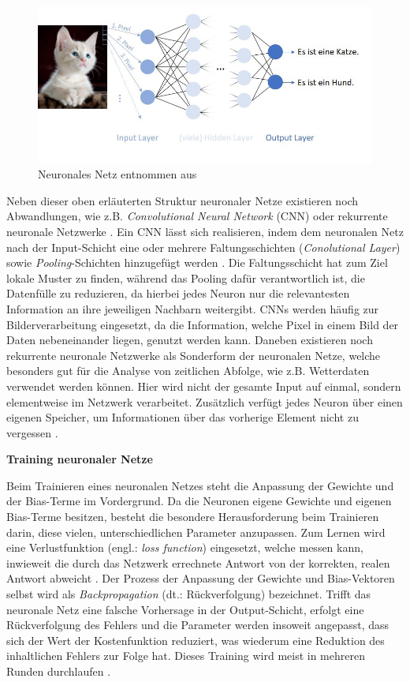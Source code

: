 \begin{figure}
    \centering
    \includegraphics[scale=0.8]{pic/MA-Bilder/neuronalesNetz.jpg}
    \caption{Neuronales Netz entnommen aus \cite{MuellerKI}}
    \label{Fig:neuronalesNetz}
\end{figure}%

Neben dieser oben erläuterten Struktur neuronaler Netze existieren noch Abwandlungen, wie z.B. \emph{Convolutional Neural Network} (CNN) oder rekurrente neuronale Netzwerke \cite{Choo.2020}. Ein CNN lässt sich realisieren, indem dem neuronalen Netz nach der Input-Schicht eine oder mehrere Faltungsschichten (\emph{Conolutional Layer}) sowie \emph{Pooling}-Schichten hinzugefügt werden \cite{Ng.2018, Choo.2020}. Die Faltungsschicht hat zum Ziel lokale Muster zu finden, während das Pooling dafür verantwortlich ist, die Datenfülle zu reduzieren, da hierbei jedes Neuron nur die relevantesten Information an ihre jeweiligen Nachbarn weitergibt. CNNs werden häufig zur Bilderverarbeitung eingesetzt, da die Information, welche Pixel in einem Bild der Daten nebeneinander liegen, genutzt werden kann. Daneben existieren noch rekurrente neuronale Netzwerke als Sonderform der neuronalen Netze, welche besonders gut für die Analyse von zeitlichen Abfolge, wie z.B. Wetterdaten verwendet werden können. Hier wird nicht der gesamte Input auf einmal, sondern elementweise im Netzwerk verarbeitet. Zusätzlich verfügt jedes Neuron über einen eigenen Speicher, um Informationen über das vorherige Element nicht zu vergessen \cite{Choo.2020}.

\textbf{Training neuronaler Netze}

Beim Trainieren eines neuronalen Netzes steht die Anpassung der Gewichte und der Bias-Terme im Vordergrund. Da die Neuronen eigene Gewichte und eigenen Bias-Terme besitzen, besteht die besondere Herausforderung beim Trainieren darin, diese vielen, unterschiedlichen Parameter anzupassen. Zum Lernen wird eine Verlustfunktion (engl.: \emph{loss function}) eingesetzt, welche messen kann, inwieweit die durch das Netzwerk errechnete Antwort von der korrekten, realen Antwort abweicht \cite{Choo.2020}. Der Prozess der Anpassung der Gewichte und Bias-Vektoren selbst wird als \emph{Backpropagation} (dt.: Rückverfolgung) bezeichnet. Trifft das neuronale Netz eine falsche Vorhersage in der Output-Schicht, erfolgt eine Rückverfolgung des Fehlers und die Parameter werden insoweit angepasst, dass sich der Wert der Kostenfunktion reduziert, was wiederum eine Reduktion des inhaltlichen Fehlers zur Folge hat. Dieses Training wird meist in mehreren Runden durchlaufen \cite{Ng.2018}.

